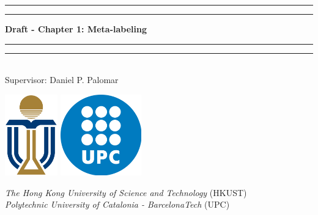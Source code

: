 \documentclass[a4paper]{article}
\begin{document}
\begin{titlepage}
  \centering
  \sc \LARGE

  \rule{\textwidth}{1.6pt}\vspace*{-\baselineskip}\vspace*{2pt}
  \rule{\textwidth}{0.4pt}
  \vspace{-6mm}

  \textbf{Draft - Chapter 1: Meta-labeling}\\[1.25ex]

  \vspace{-3.5mm}
  \rule{\textwidth}{0.4pt}\vspace*{-\baselineskip}\vspace*{3.2pt}
  \rule{\textwidth}{1.6pt}
  \vfill

  \Large
  \\

  \Large
  Supervisor: Daniel P. Palomar
  \vfill

  \includegraphics[height=3.5cm]{img/hkust.png} \hspace{2.5cm}
  \includegraphics[height=3.5cm]{img/upc.png}
  \vspace{1cm}

  \textit{The Hong Kong University of Science and Technology} (HKUST)\\
  \vspace{1cm}
  \textit{Polytechnic University of Catalonia - BarcelonaTech} (UPC)\\
  \vfill

\end{titlepage}

\null
\thispagestyle{empty}
\addtocounter{page}{-3}
\newpage

\thispagestyle{empty}
\tableofcontents
\end{document}
